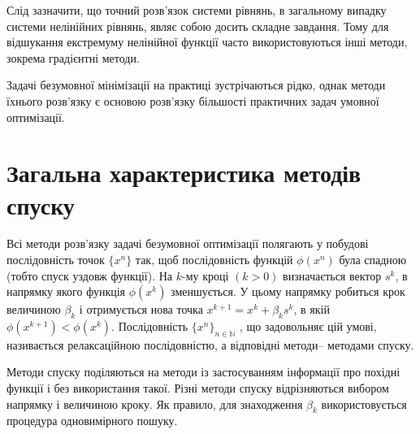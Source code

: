 Слід зазначити, що точний розв’язок системи рівнянь, в загальному випадку системи нелінійних рівнянь, являє собою досить складне завдання. Тому для відшукання екстремуму нелінійної функції часто використовуються інші методи, зокрема градієнтні методи.

Задачі безумовної мінімізації на практиці зустрічаються рідко, однак методи їхнього розв’язку є основою розв’язку більшості практичних задач умовної оптимізації.

\section {Загальна характеристика методів спуску}

Всі методи розв'язку задачі безумовної оптимізації полягають у побудові послідовність точок $\{x^n\}$ так, щоб послідовність функцій $\phi(x^n)$ була спадною (тобто спуск уздовж функції). На $k$-му кроці $(k > 0)$ визначається вектор $s^k$, в напрямку якого функція $\phi(x^k)$ зменшується. У цьому напрямку робиться крок величиною $\beta_k$ і отримується нова точка
$x^{k+1} = x^k + \beta_ks^k$, в якій $\phi(x^{k+1}) < \phi(x^k)$. Послідовність $\{x^n\}_{n \in \mathbb{N}}$ , що задовольняє цій умові, називається релаксаційною послідовністю, а відповідні методи– методами спуску.

 Методи спуску поділяються на методи із застосуванням інформації про похідні функції і без використання такої. Різні методи спуску відрізняються вибором напрямку і величиною кроку. Як правило, для знаходження $\beta_k$ використовується процедура одновимірного пошуку.

